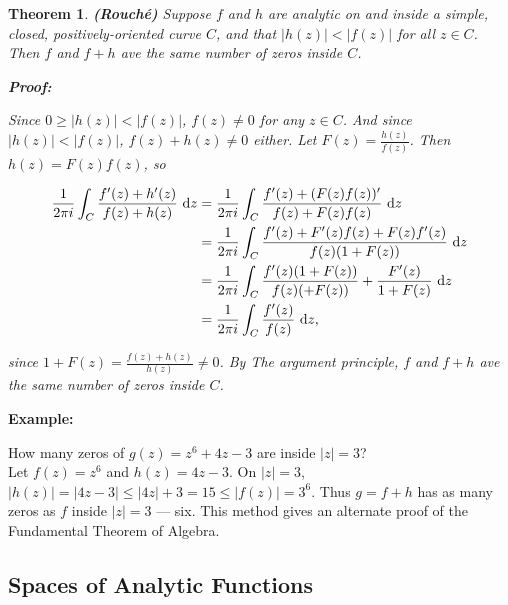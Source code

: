 \documentclass{article}
\theoremstyle{colontheorem}
\newtheorem{theorem}{Theorem}[section]
\newenvironment{Theorem}
{
	\begin{mdframed}[backgroundcolor=TheoremOrange!10]
	\begin{theorem}
}
{
	\end{theorem}
	\end{mdframed}
	
	\vspace{.15in}
}
\newenvironment{Proof}
{
	\begin{mdframed}[backgroundcolor=ProofPurple!10]
	\textbf{Proof:}%
}
{
	\end{mdframed}
	
	\vspace{.085in}
}
\newenvironment{Example}
{
	\begin{mdframed}
	\textbf{Example:}%
}
{
	\end{mdframed}
	
	\vspace{.15in}
}
\begin{document}
\begin{Theorem}
	
	\textbf{(Rouch\'e)} Suppose $f$ and $h$ are analytic on and inside a  simple, closed, positively-oriented curve $C$, and that $|h(z)| < |f(z)|$ for all $z \in C$. Then $f$ and $f + h$ ave the same number of zeros inside $C$.
	
	\begin{Proof}
		Since $0 \geq |h(z)| < |f(z)|$, $f(z) \neq 0 $ for any $z \in C$. And since $|h(z)| < |f(z)|$, $f(z) + h(z) \neq 0$ either. Let $F(z) = \frac{h(z)}{f(z)}$. Then $h(z) = F(z)f(z)$, so
		
		\begin{align*}
			\frac{1}{2 \pi i} \int_C \frac{f'(z) + h'(z)}{f(z) + h(z)}\ \textnormal{d}z &= \frac{1}{2 \pi i} \int_C \frac{f'(z) + (F(z)f(z))'}{f(z) + F(z)f(z)}\ \textnormal{d}z\\
			&= \frac{1}{2 \pi i} \int_C \frac{f'(z) + F'(z)f(z) + F(z)f'(z)}{f(z)(1 + F(z))}\ \textnormal{d}z\\
			&= \frac{1}{2 \pi i} \int_C \frac{f'(z)(1 + F(z))}{f(z)( + F(z))} + \frac{F'(z)}{1 + F(z)}\ \textnormal{d}z\\
			&= \frac{1}{2 \pi i} \int_C \frac{f'(z)}{f(z)}\ \textnormal{d}z \textnormal{,}
		\end{align*}
		
		since $1 + F(z) = \frac{f(z) + h(z)}{h(z)} \neq 0$. By The argument principle, $f$ and $f + h$ ave the same number of zeros inside $C$.
		
	\end{Proof}
	
\end{Theorem}



\begin{Example}
	How many zeros of $g(z) = z^6 + 4z - 3$ are inside $|z| = 3$?\\
	
	Let $f(z) = z^6$ and $h(z) = 4z - 3$. On $|z| = 3$, $|h(z)| = |4z - 3| \leq |4z| + 3 = 15 \leq |f(z)| = 3^6$. Thus $g = f + h$ has as many zeros as $f$ inside $|z| = 3$ --- six. This method gives an alternate proof of the Fundamental Theorem of Algebra.
	
\end{Example}





\begin{center}
	\pagebreak
	
	\section{Spaces of Analytic Functions}
	
	\vspace{.1in}
\end{center}
\end{document}

